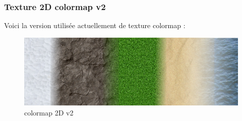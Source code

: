 \documentclass{article}
\begin{document}
\subsubsection{Texture 2D colormap v2}
Voici la version utilisée actuellement de texture colormap :

\begin{figure}[h]
	\center
	\includegraphics[scale=0.30]{../textures/2DcolorTexv2.png}
	\caption{colormap 2D v2}
\end{figure}
\end{document}
